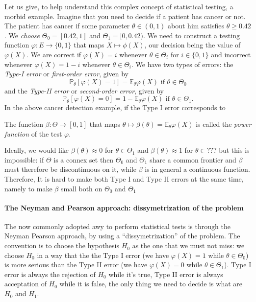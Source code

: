 \documentclass[
	fontsize=11pt, %
	twoside=false, %
	numbers=noenddot, %
]{kaobook}
\renewcommand{\P}{\mathbb P}
\newcommand{\E}{\mathbb E}
\newcommand{\goes}{\rightarrow}
\begin{document}
Let us give, to help understand this complex concept of statistical testing, a morbid example.
Imagine that you need to decide if a patient has cancer or not.
The patient has cancer if some parameter $\theta \in (0, 1)$ about him satisfies 
$\theta \geq 0.42$.
We \emph{choose} $\Theta_0 = [0.42, 1]$ and $\Theta_1 = [0, 0.42)$.
We need to construct a testing function $\varphi : E \goes \{ 0, 1 \}$ that maps $X \mapsto \phi(X)$, our decision being the value of $\varphi(X)$.
We are correct if $\varphi(X) = i$ whenever $\theta \in \Theta_i$ for $i \in \{ 0, 1 \}$ and incorrect whenever  $\varphi(X) = 1 - i$ whenever $\theta \in \Theta_i$.
We have two types of errors: the \emph{Type-I error} or \emph{first-order error}, given by 
\begin{equation}
	\label{eq:type-1-error}
	\P_\theta[ \varphi(X) = 1] = \E_\theta \varphi(X) \text{ if } 
	\theta \in \Theta_0
\end{equation}
and the \emph{Type-II error} or \emph{second-order error}, given by 
\begin{equation}
	\label{eq:type-2-error}
	\P_\theta[ \varphi(X) = 0] = 1 - \E_\theta \varphi(X) \text{ if } 
	\theta \in \Theta_1.
\end{equation}
In the above cancer detection example, if the Type I error corresponds to 

The function $\beta : \Theta \goes [0, 1]$ that maps $\theta \mapsto \beta(\theta) = \E_\theta \varphi(X)$ is called the \emph{power function} of the test $\varphi$.

Ideally, we would like $\beta(\theta) \approx 0$ for $\theta \in \Theta_1$ and $\beta(\theta) \approx 1$ for $\theta \in ???$  but this is impossible: if $\Theta$ is a connex set then $\Theta_0$ and $\Theta_1$ share a common frontier and $\beta$ must therefore be discontinuous on it, while $\beta$ is in general a continuous function.
Therefore, It is hard to make both Type I and Type II errors at the same time, namely to make $\beta$ small both on $\Theta_0$ and $\Theta_1$

\paragraph{The Neyman and Pearson approach: dissymetrization of the problem} %

The now commonly adopted awy to perform statistical tests is through the Neyman Pearson approach, by using a ``dissymetrization'' of the problem.
The convention is to choose the hypothesis $H_0$ as the one that we must not miss: we choose $H_0$ in a way that the the Type I error (we have $\varphi(X)=1$ while $\theta \in \Theta_0$) is more serious than the Type II error (we have $\varphi(X)=0$ while $\theta \in \Theta_1$).
Type I error is always the rejection of $H_0$ while it's true, Type II error is always acceptation of $H_0$ while it is false, the only thing we need to decide is what are $H_0$ and $H_1$.
\end{document}
